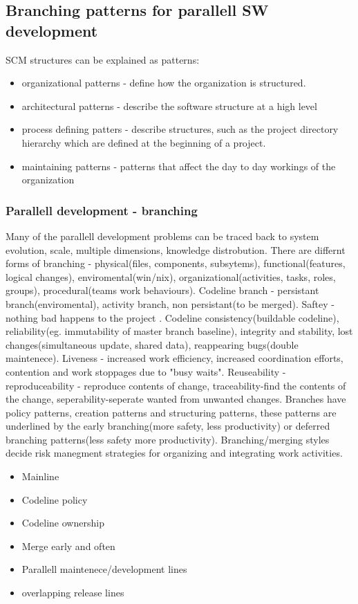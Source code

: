 \documentclass{article}
\begin{document}
\begin{itemize}
\begin{itemize}
\begin{itemize}
    \subsection{Branching patterns for parallell SW development}
    SCM structures can be explained as patterns:
    \begin{itemize}
    \item organizational patterns - define how the organization is structured.
    \item architectural patterns - describe the software structure at a high level
    \item process defining patters - describe structures, such as the project directory hierarchy which are defined at the beginning of a project.
    \item maintaining patterns - patterns that affect the day to day workings of the organization
    \end{itemize}
    \subsubsection{Parallell development - branching}
    Many of the parallell development problems can be traced back to system evolution, scale, multiple dimensions, knowledge distrobution.
    There are differnt forms of branching - physical(files, components, subsytems), functional(features, logical changes), enviromental(win/nix), organizational(activities, tasks, roles, groups), procedural(teams work behaviours).
    Codeline branch - persistant branch(enviromental), activity branch, non persistant(to be merged).
    Saftey - nothing bad happens to the project . Codeline consistency(buildable codeline), reliability(eg. immutability of master branch baseline),
    integrity and stability, lost changes(simultaneous update, shared data), reappearing bugs(double maintenece).
    Liveness - increased work efficiency, increased coordination efforts, contention and work stoppages due to "busy waits".
    Reuseability - reproduceability - reproduce contents of change, traceability-find the contents of the change, seperability-seperate wanted from unwanted changes.
    Branches have policy patterns, creation patterns and structuring patterns, these patterns are underlined by the early branching(more safety, less productivity) or deferred branching patterns(less safety more productivity).
    Branching/merging styles decide risk manegment strategies for organizing and integrating work activities.
    \begin{itemize} Core set of branching patterns:
    \item Mainline
    \item Codeline policy
    \item Codeline ownership
    \item Merge early and often
    \item Parallell maintenece/development lines
    \item overlapping release lines
    \end{itemize}


\end{itemize}
\end{itemize}
\end{itemize}
\end{document}
